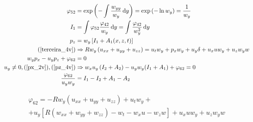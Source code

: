 \documentclass[12pt,a4paper]{article}
\begin{document}
	\begin{align}
	  \varphi_{52} &= \exp \left(- \int{ \frac{w_{yy}}{w_y} \,\mathrm{d} y} \right) = \exp \left(- \ln w_y \right) = \frac{1}{w_y} \\
	  I_1 &= \int{ \varphi_{52} \frac{\varphi_{42} }{w_y} \,\mathrm{d} y} = \int{ \frac{\varphi_{42}}{w_y^2} \,\mathrm{d} y} \\
	  p_z &= w_y \left[ I_1 + A_1(x,z,t) \right] \label{pz_4v} \\
    (\ref{terceira_4v}) &\Rightarrow R w_y \left(u_{xx} + u_{yy} + u_{zz} \right) = u_t w_y + p_x w_y + u_y \delta + u_x u w_y + u_z w_y w \\
    w_y p_x - u_y p_z + \varphi_{62} &= 0 \\
    u_y \neq 0, (\ref{px_2v}), (\ref{pz_4v}) &\Rightarrow w_x u_y \left(I_2 + A_2 \right) - u_y w_y (I_1 + A_1) + \varphi_{62} = 0 \\
    \frac{\varphi_{62}}{u_y w_y} &= I_1 - I_2 + A_1 - A_2
	\end{align}

	\begin{multline}
	  \varphi_{62} = - R w_y \left(u_{xx} + u_{yy} + u_{zz} \right) + u_t w_y + \\
	  + u_y \left[ R \left(w_{xx} + w_{yy} + w_{zz} \right) - w_t - w_x u - w_z w \right] + u_x u w_y + u_z w_y w
	\end{multline}
\end{document}
